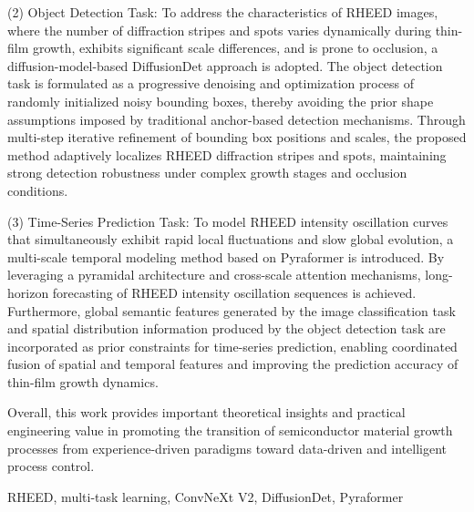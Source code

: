 \begin{abstractEN}
(2) Object Detection Task: To address the characteristics of RHEED images, where the number of diffraction stripes and spots varies dynamically during thin-film growth, exhibits significant scale differences, and is prone to occlusion, a diffusion-model-based DiffusionDet approach is adopted. The object detection task is formulated as a progressive denoising and optimization process of randomly initialized noisy bounding boxes, thereby avoiding the prior shape assumptions imposed by traditional anchor-based detection mechanisms. Through multi-step iterative refinement of bounding box positions and scales, the proposed method adaptively localizes RHEED diffraction stripes and spots, maintaining strong detection robustness under complex growth stages and occlusion conditions.

(3) Time-Series Prediction Task: To model RHEED intensity oscillation curves that simultaneously exhibit rapid local fluctuations and slow global evolution, a multi-scale temporal modeling method based on Pyraformer is introduced. By leveraging a pyramidal architecture and cross-scale attention mechanisms, long-horizon forecasting of RHEED intensity oscillation sequences is achieved. Furthermore, global semantic features generated by the image classification task and spatial distribution information produced by the object detection task are incorporated as prior constraints for time-series prediction, enabling coordinated fusion of spatial and temporal features and improving the prediction accuracy of thin-film growth dynamics.

Overall, this work provides important theoretical insights and practical engineering value in promoting the transition of semiconductor material growth processes from experience-driven paradigms toward data-driven and intelligent process control.

\end{abstractEN}

\begin{keywordEN}
RHEED, multi-task learning, ConvNeXt V2, DiffusionDet, Pyraformer
\end{keywordEN}

